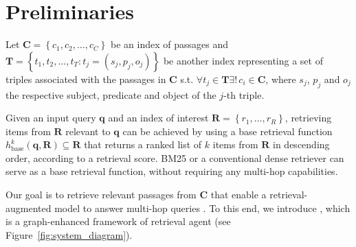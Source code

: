 \section{Preliminaries}
\label{sec:preliminaries}

Let $\mathbf{C} = \left \{c_1, c_2, \ldots, c_C \right \}$ be an index of passages and $\mathbf{T} = \left \{t_1, t_2, \ldots,t_T: t_j = \left ( s_j, p_j, o_j \right ) \right \}$ be another index representing a set of triples associated with the passages in $\mathbf{C}$ s.t. $\forall t_j \in \mathbf{T} \exists! \, c_i \in \mathbf{C}$, where $s_j$, $p_j$ and $o_j$ the respective subject, predicate and object of the $j$-th
triple. 

Given an input query $\mathbf{q}$ and an index of interest $\mathbf{R} = \left \{r_1, \ldots, r_R \right \}$, retrieving items from $\mathbf{R}$ relevant to $\mathbf{q}$ can be achieved by using a base retrieval function $h^k_{\text{base}}\left( \mathbf{q}, {\mathbf{R}}\right ) \subseteq \mathbf{R}$ that returns a ranked list of $k$ items from $\mathbf{R}$ in descending order, according to a retrieval score. BM25 or a conventional dense retriever can serve as a base retrieval function, without requiring any multi-hop capabilities.

Our goal is to retrieve relevant passages from $\mathbf{C}$ that enable a retrieval-augmented model to answer multi-hop queries \cite{Lewis2020}. To this end, we introduce \gear, which is a graph-enhanced framework of retrieval agent (see Figure~\ref{fig:system_diagram}). 
